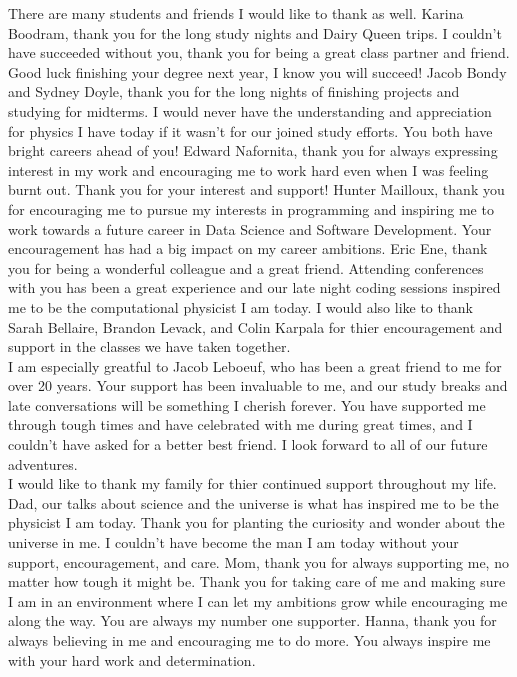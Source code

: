 \documentclass[12pt,oneside,final]{vlsithesis}
\begin{document}
{There are many students and friends I would like to thank as well. Karina Boodram, thank you for the long study nights and Dairy Queen trips. I couldn't have succeeded without you, thank you for being a great class partner and friend. Good luck finishing your degree next year, I know you will succeed! Jacob Bondy and Sydney Doyle, thank you for the long nights of finishing projects and studying for midterms. I would never have the understanding and appreciation for physics I have today if it wasn't for our joined study efforts. You both have bright careers ahead of you! Edward Nafornita, thank you for always expressing interest in my work and encouraging me to work hard even when I was feeling burnt out. Thank you for your interest and support! Hunter Mailloux, thank you for encouraging me to pursue my interests in programming and inspiring me to work towards a future career in Data Science and Software Development. Your encouragement has had a big impact on my career ambitions. Eric Ene, thank you for being a wonderful colleague and a great friend. Attending conferences with you has been a great experience and our late night coding sessions inspired me to be the computational physicist I am today. I would also like to thank Sarah Bellaire, Brandon Levack, and Colin Karpala for thier encouragement and support in the classes we have taken together. \\

I am especially greatful to Jacob Leboeuf, who has been a great friend to me for over 20 years. Your support has been invaluable to me, and our study breaks and late conversations will be something I cherish forever. You have supported me through tough times and have celebrated with me during great times, and I couldn't have asked for a better best friend. I look forward to all of our future adventures.\\

I would like to thank my family for thier continued support throughout my life. Dad, our talks about science and the universe is what has inspired me to be the physicist I am today. Thank you for planting the curiosity and wonder about the universe in me. I couldn't have become the man I am today without your support, encouragement, and care. Mom, thank you for always supporting me, no matter how tough it might be. Thank you for taking care of me and making sure I am in an environment where I can let my ambitions grow while encouraging me along the way. You are always my number one supporter. Hanna, thank you for always believing in me and encouraging me to do more. You always inspire me with your hard work and determination.\\

}
\end{document}
